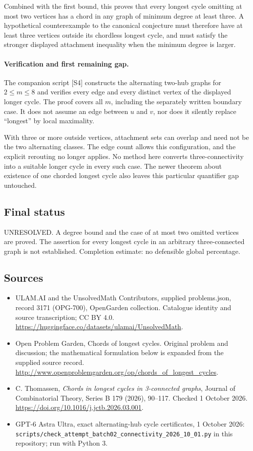 \documentclass[11pt,a4paper]{article}
\begin{document}
Combined with the first bound, this proves that every longest cycle
omitting at most two vertices has a chord in any graph of minimum
degree at least three. A hypothetical counterexample to the canonical
conjecture must therefore have at least three vertices outside its
chordless longest cycle, and must satisfy the stronger displayed
attachment inequality when the minimum degree is larger.

\paragraph{Verification and first remaining gap.}
The companion script [S4] constructs the alternating two-hub graphs
for $2\le m\le8$ and verifies every edge and every distinct vertex
of the displayed longer cycle. The proof covers all $m$, including
the separately written boundary case. It does not assume an edge
between $u$ and $v$, nor does it silently replace ``longest'' by
local maximality.

With three or more outside vertices, attachment sets can overlap and
need not be the two alternating classes. The edge count allows this
configuration, and the explicit rerouting no longer applies. No method
here converts three-connectivity into a suitable longer cycle in every
such case. The newer theorem about existence of one chorded longest
cycle also leaves this particular quantifier gap untouched.

\subsection{Final status}
UNRESOLVED. A degree bound and the case of at most two omitted vertices
are proved. The assertion for every longest cycle in an arbitrary
three-connected graph is not established. Completion estimate: no
defensible global percentage.

\subsection{Sources}
\begin{itemize}
\item[S1] ULAM.AI and the UnsolvedMath Contributors, supplied problems.json, record 3171 (OPG-700), OpenGarden collection. Catalogue identity and source transcription; CC BY 4.0.
\url{https://huggingface.co/datasets/ulamai/UnsolvedMath}.
\item[S2] Open Problem Garden, Chords of longest cycles. Original problem and discussion; the mathematical formulation below is expanded from the supplied source record.
\url{http://www.openproblemgarden.org/op/chords_of_longest_cycles}.
\item[S3] C. Thomassen, \emph{Chords in longest cycles in 3-connected graphs}, Journal of Combinatorial Theory, Series B 179 (2026), 90--117. Checked 1 October 2026.
\url{https://doi.org/10.1016/j.jctb.2026.03.001}.
\item[S4] GPT-6 Astra Ultra, exact alternating-hub cycle certificates, 1 October 2026: \texttt{scripts/check\_attempt\_batch02\_connectivity\_2026\_10\_01.py} in this repository; run with Python 3.
\end{itemize}
\end{document}
